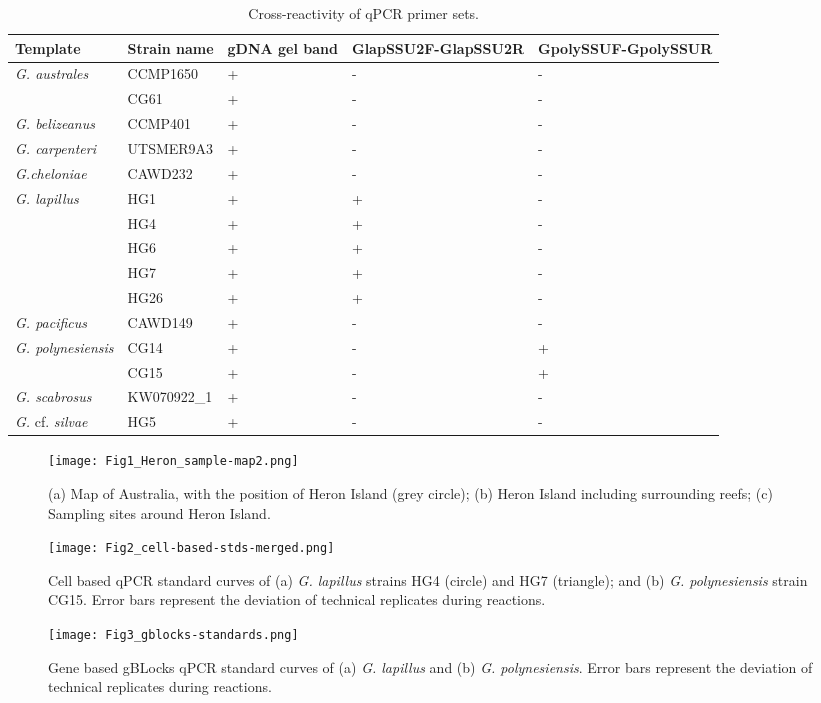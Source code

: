 \documentclass[12pt]{article}
\begin{document}
\begin{table}
\caption{Cross-reactivity of qPCR primer sets.}
\label{tbl:CrossreactTable}
\begin{tabular}{ | p{4cm} | p{3cm} | p{2cm} | p{2.5cm} | p{2.5cm} | }
\hline
\textbf{Template} & \textbf{Strain name} & \textbf{gDNA gel band} & \textbf{GlapSSU2F-GlapSSU2R} & \textbf{GpolySSUF-GpolySSUR} \\
\hline
\emph{G. australes} & CCMP1650 &+&-&- \\
\hline
& CG61 &+&-&- \\
\hline
\emph{G. belizeanus}&CCMP401&+&-&-\\
\hline
\emph{G. carpenteri}&UTSMER9A3&+&-&-\\
\hline
\emph{G.cheloniae}&CAWD232&+&-&-\\
\hline
\emph{G. lapillus}&HG1&+&+&-\\
\hline
&HG4&+&+&-\\
\hline
&HG6&+&+&-\\
\hline
&HG7&+&+&-\\
\hline
&HG26&+&+&-\\
\hline
\emph{G. pacificus}&CAWD149&+&-&-\\
\hline
\emph{G. polynesiensis}&CG14&+&-&+\\
\hline
&CG15&+&-&+\\
\hline
\emph{G. scabrosus}&KW070922\_1&+&-&-\\
\hline
\emph{G.} cf. \emph{silvae}&HG5&+&-&-\\
\hline
\end{tabular}
\end{table}
\FloatBarrier
\begin{figure} 
\texttt{[image: Fig1\_Heron\_sample-map2.png]} 
\caption{(a) Map of Australia, with the position of Heron Island (grey circle); (b) Heron Island including surrounding reefs; (c) Sampling sites around Heron Island.} 
\label{fig:samplesites}
\end{figure} 
\FloatBarrier
\begin{figure}
\texttt{[image: Fig2\_cell-based-stds-merged.png]}
\caption{Cell based qPCR standard curves of (a) \emph{G. lapillus} strains HG4 (circle) and HG7 (triangle); and (b) \emph{G. polynesiensis} strain CG15. Error bars represent the deviation of technical replicates during reactions.}
\label{fig:stdCurve}
\end{figure} 
\FloatBarrier
\begin{figure}
\texttt{[image: Fig3\_gblocks-standards.png]}
\caption{Gene based gBLocks qPCR standard curves of (a) \emph{G. lapillus} and (b) \emph{G. polynesiensis}. Error bars represent the deviation of technical replicates during reactions.} %
\label{fig:lapigblocks}
\end{figure}
\end{document}
